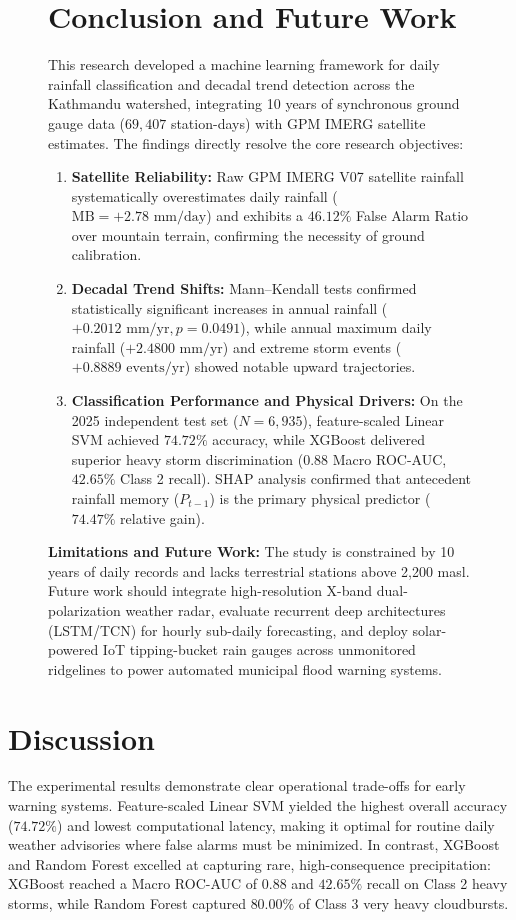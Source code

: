 \documentclass[conference]{IEEEtran}
\begin{document}
\begin{figure}[!tbp]
\begin{minipage}[t]{0.49\textwidth}
  \section{Conclusion and Future Work}
  \label{sec:conclusion}
  This research developed a machine learning framework for daily rainfall classification and decadal trend detection across the Kathmandu watershed, integrating 10 years of synchronous ground gauge data ($69{,}407$ station-days) with GPM IMERG satellite estimates. The findings directly resolve the core research objectives:
  \begin{enumerate}\setlength{\itemsep}{1.5pt}\setlength{\parskip}{0pt}
      \item \textbf{Satellite Reliability:} Raw GPM IMERG V07 satellite rainfall systematically overestimates daily rainfall ($\text{MB} = +2.78\text{ mm/day}$) and exhibits a $46.12\%$ False Alarm Ratio over mountain terrain, confirming the necessity of ground calibration.
      \item \textbf{Decadal Trend Shifts:} Mann--Kendall tests confirmed statistically significant increases in annual rainfall ($+0.2012\text{ mm/yr}, p = 0.0491$), while annual maximum daily rainfall ($+2.4800\text{ mm/yr}$) and extreme storm events ($+0.8889\text{ events/yr}$) showed notable upward trajectories.
      \item \textbf{Classification Performance and Physical Drivers:} On the 2025 independent test set ($N = 6{,}935$), feature-scaled Linear SVM achieved $74.72\%$ accuracy, while XGBoost delivered superior heavy storm discrimination ($0.88$ Macro ROC-AUC, $42.65\%$ Class 2 recall). SHAP analysis confirmed that antecedent rainfall memory ($P_{t-1}$) is the primary physical predictor ($74.47\%$ relative gain).
  \end{enumerate}
  \vspace{3pt}
  \textbf{Limitations and Future Work:} The study is constrained by 10 years of daily records and lacks terrestrial stations above 2,200 masl. Future work should integrate high-resolution X-band dual-polarization weather radar, evaluate recurrent deep architectures (LSTM/TCN) for hourly sub-daily forecasting, and deploy solar-powered IoT tipping-bucket rain gauges across unmonitored ridgelines to power automated municipal flood warning systems.
\end{minipage}
\end{figure}

\setcounter{section}{7}
\section{Discussion}
\label{sec:discussion}
The experimental results demonstrate clear operational trade-offs for early warning systems. Feature-scaled Linear SVM yielded the highest overall accuracy ($74.72\%$) and lowest computational latency, making it optimal for routine daily weather advisories where false alarms must be minimized. In contrast, XGBoost and Random Forest excelled at capturing rare, high-consequence precipitation: XGBoost reached a Macro ROC-AUC of $0.88$ and $42.65\%$ recall on Class 2 heavy storms, while Random Forest captured $80.00\%$ of Class 3 very heavy cloudbursts.
\end{document}
